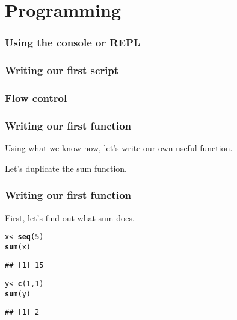 \documentclass{beamer}\usepackage{graphicx, color}
\makeatletter
\newcommand{\hlfunctioncall}[1]{\textcolor[rgb]{0.501960784313725,0,0.329411764705882}{\textbf{#1}}}%
\newenvironment{kframe}{%
 \def\at@end@of@kframe{}%
 \ifinner\ifhmode%
  \def\at@end@of@kframe{\end{minipage}}%
  \begin{minipage}{\columnwidth}%
 \fi\fi%
 \def\FrameCommand##1{\hskip\@totalleftmargin \hskip-\fboxsep
 \colorbox{shadecolor}{##1}\hskip-\fboxsep
     \hskip-\linewidth \hskip-\@totalleftmargin \hskip\columnwidth}%
 \MakeFramed {\advance\hsize-\width
   \@totalleftmargin\z@ \linewidth\hsize
   \@setminipage}}%
 {\par\unskip\endMakeFramed%
 \at@end@of@kframe}
\newenvironment{knitrout}{}{} %
\makeatother
\begin{document}
\section{Programming}
\begin{frame}
  \frametitle{Using the console or REPL}
\end{frame}

\begin{frame}
  \frametitle{Writing our first script}
\end{frame}

\begin{frame}
  \frametitle{Flow control}
\end{frame}

\begin{frame}
  \frametitle{Writing our first function}
  Using what we know now, let's write our own useful function.

  Let's duplicate the sum function.
\end{frame}

\begin{frame}[fragile]
  \frametitle{Writing our first function}

  First, let's find out what sum does.

\begin{knitrout}\small
{}\color{fgcolor}\begin{kframe}
\begin{alltt}
x <- \hlfunctioncall{seq}(5)
\hlfunctioncall{sum}(x)
\end{alltt}
\begin{verbatim}
## [1] 15
\end{verbatim}
\begin{alltt}

y <- \hlfunctioncall{c}(1, 1)
\hlfunctioncall{sum}(y)
\end{alltt}
\begin{verbatim}
## [1] 2
\end{verbatim}
\end{kframe}
\end{knitrout}


\end{frame}
\end{document}

